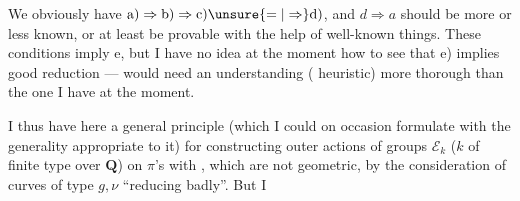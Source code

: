 We obviously have $\mathrm{a)}\Rightarrow\mathrm{b)}\Rightarrow\mathrm{c)}\unsure{=|\Rightarrow}\mathrm{d)}$, and $d\Rightarrow a$ should be more or less known, or at least be provable with the help of well-known things. These conditions imply e, but I have no idea at the moment how to see that e) implies good reduction --- would need an understanding ( heuristic) more thorough than the one I have at the moment.

I thus have here a general principle (which I could on occasion formulate with the generality appropriate to it) for constructing  outer actions of groups $\mathcal E_k$ ($k$  of finite type over $\mathbf Q$) on $\pi$'s with , which  are not geometric, by  the consideration of curves of type $g,\nu$ ``reducing badly''. But I 
